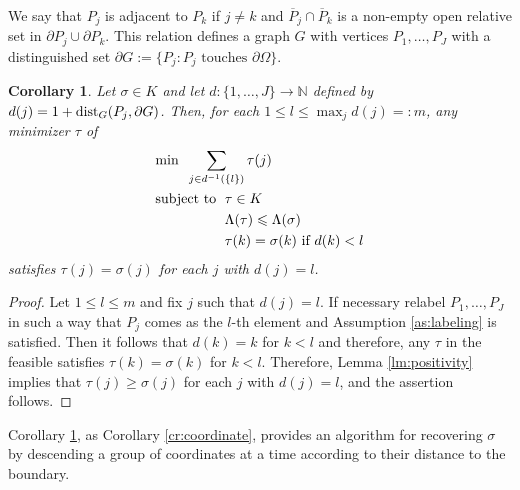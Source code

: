 \documentclass{article}
\newtheorem{corollary}[theorem]{Corollary}
\theoremstyle{definition}
\theoremstyle{remark}
\renewcommand{\leq}{\leqslant}
\renewcommand{\geq}{\geqslant}
\begin{document}
We say that $P_j$ is adjacent to $P_k$ if $j\neq k$ and $\overline P_j \cap \overline P_k$ is a non-empty open relative set in $\partial P_j\cup \partial P_k$.
This relation defines a graph $G$ with vertices $P_1,\dots,P_J$ with a distinguished set $\partial G := \{ P_j : P_j \text{ touches }\partial\Omega\}$.
\begin{corollary}\label{cr:multipledescent}
Let $\sigma\in K$ and let $d:\{1,\dots,J\}\to\mathbb N$ defined by $d(j)=1+\textup{dist}_G(P_j,\partial G)$.
Then, for each $1\leq l \leq \max_j d(j)=:m$, any minimizer $\tau$ of
\begin{align*}
&\textup{min}\;\; \sum_{j\in d^{-1}\left(\{l\}\right)}\tau(j) \\
&\textup{subject to }\; \tau \in K \\
&\phantom{\textup{subject to }\;} \Lambda(\tau) \leq \Lambda(\sigma) \\
&\phantom{\textup{subject to }\;} \tau(k) = \sigma(k) \textup{ if } d(k) < l
\end{align*}
satisfies $\tau(j)=\sigma(j)$ for each $j$ with $d(j)=l$.
\end{corollary}
\begin{proof}
Let $\displaystyle 1\leq l \leq m$ and fix $j$ such that $d(j)=l$.
If necessary relabel $P_1,\dots,P_J$ in such a way that $P_j$ comes as the $l$-th element and Assumption \ref{as:labeling} is satisfied.
Then it follows that $d(k)=k$ for $k<l$ and therefore, any $\tau$ in the feasible satisfies $\tau(k)=\sigma(k)$ for $k<l$.
Therefore, Lemma \ref{lm:positivity} implies that $\tau(j)\geq\sigma(j)$ for each $j$ with $d(j)=l$, and the assertion follows.
\end{proof}
Corollary \ref{cr:multipledescent}, as Corollary \ref{cr:coordinate}, provides an algorithm for recovering $\sigma$ by descending a group of coordinates at a time according to their distance to the boundary.
\end{document}
